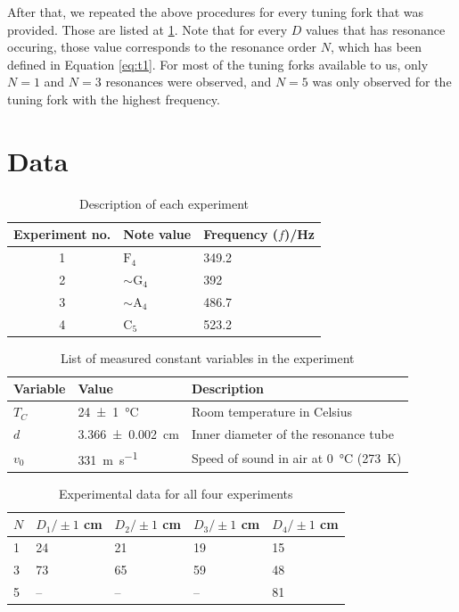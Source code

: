\documentclass[letter]{article}
\numberwithin{equation}{section}
\begin{document}
After that, we repeated the above procedures for every tuning fork that was provided. Those are listed at \ref{table:d1}. Note that for every \(D\) values that has resonance occuring, those value corresponds to the resonance order \(N\), which has been defined in Equation \eqref{eq:t1}. For most of the tuning forks available to us, only \(N = 1\) and \(N = 3\) resonances were observed, and \(N = 5\) was only observed for the tuning fork with the highest frequency.

\pagebreak
\section{Data}
\begin{table}[!h]
  \centering
  \begin{tabular}{|c|l|l|}
    \hline
    Experiment no.  & Note value            & Frequency (\(f\))/\si{Hz} \\
    \hline
    1               & \(\mathrm{F}_4\)      & 349.2 \\
    2               & \(\sim \mathrm{G}_4\) & 392 \\
    3               & \(\sim \mathrm{A}_4\) & 486.7 \\
    4               & \(\mathrm{C}_5\)      & 523.2 \\
    \hline
  \end{tabular}
  \caption{Description of each experiment}
  \label{table:d1}
\end{table}

\begin{table}[!h]
  \centering
  \begin{tabular}{|l|l|l|}
    \hline
    Variable  & Value                       & Description\\
    \hline
    \(T_C\)   & \SI{24(1)}{\celsius}        & {Room temperature in Celsius}\\
    \(d\)     & \SI{3.366(2)}{\centi\metre} & {Inner diameter of the resonance tube}\\
    \(v_0\)   & \SI{331}{\metre\per\second} & {Speed of sound in air at \SI{0}{\celsius} (\SI{273}{\kelvin})}\\
    \hline
  \end{tabular}
  \caption{List of measured constant variables in the experiment}
  \label{table:d2}
\end{table}

\begin{table}[!h]
  \centering
  \begin{tabular}{|l|l|l|l|l|}
    \hline
    \(N\) & \(D_1 / \pm 1\) \si{cm} & \(D_2 / \pm 1\) \si{cm} & \(D_3 / \pm 1\) \si{cm} & \(D_4 / \pm 1\) \si{cm} \\
    \hline
    1  & 24  & 21  & 19  & 15 \\
    3  & 73  & 65  & 59  & 48 \\
    5  & --  & --  & --  & 81 \\
    \hline
  \end{tabular}
  \caption{Experimental data for all four experiments}
  \label{table:d3}
\end{table}
\end{document}
